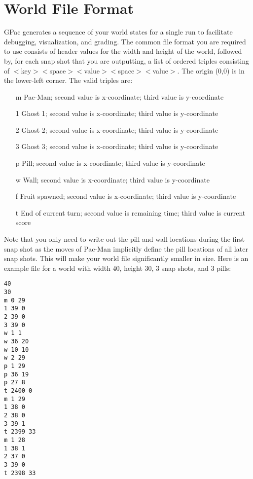 \documentclass{article}
\begin{document}
\section*{World File Format}
GPac generates a sequence of your world states for a single run to facilitate debugging, visualization, and grading. The common file format you are required to use consists of header values for the width and height of the world, followed by, for each snap shot that you are outputting, a list of ordered triples consisting of $<$key$><$space$><$value$><$space$><$value$>$. The origin (0,0) is in the lower-left corner. The valid triples are:
\begin{itemize}
\item[m] Pac-Man; second value is x-coordinate; third value is y-coordinate
\item[1] Ghost 1; second value is x-coordinate; third value is y-coordinate
\item[2] Ghost 2; second value is x-coordinate; third value is y-coordinate
\item[3] Ghost 3; second value is x-coordinate; third value is y-coordinate
\item[p] Pill; second value is x-coordinate; third value is y-coordinate
\item[w] Wall; second value is x-coordinate; third value is y-coordinate
\item[f] Fruit spawned; second value is x-coordinate; third value is y-coordinate
\item[t] End of current turn; second value is remaining time; third value is current score
\end{itemize}
Note that you only need to write out the pill and wall locations during the first snap shot as the moves of Pac-Man implicitly define the pill locations of all later snap shots. This will make your world file significantly smaller in size.
\noindent Here is an example file for a world with width 40, height 30, 3 snap shots, and 3 pills:
\begin{verbatim}
40
30
m 0 29
1 39 0
2 39 0
3 39 0
w 1 1
w 36 20
w 10 10
w 2 29
p 1 29
p 36 19
p 27 8
t 2400 0
m 1 29
1 38 0
2 38 0
3 39 1
t 2399 33
m 1 28
1 38 1
2 37 0
3 39 0
t 2398 33
\end{verbatim}
\end{document}
